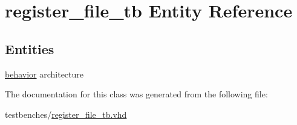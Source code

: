 \hypertarget{classregister__file__tb}{\section{register\-\_\-file\-\_\-tb \-Entity \-Reference}
\label{classregister__file__tb}
}
\subsection*{\-Entities}
\begin{DoxyCompactItemize}
\item 
\hyperlink{classregister__file__tb_1_1behavior}{behavior} architecture
\end{DoxyCompactItemize}


\-The documentation for this class was generated from the following file\-:\begin{DoxyCompactItemize}
\item 
testbenches/\hyperlink{register__file__tb_8vhd}{register\-\_\-file\-\_\-tb.\-vhd}\end{DoxyCompactItemize}
